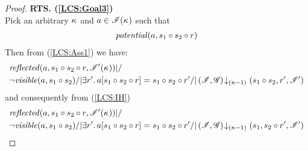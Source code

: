 \begin{lemma}
\begin{proof}
\noindent\textbf{RTS. (\ref{LCS:Goal3})}\\
Pick an arbitrary $\kappa_{}$ and $a \in \mathscr{I}(\kappa_{})$ such that 
\begin{align}
	\mathit{potential}(a, s_1 \circ s_2 \circ r) \label{LCS:Ass12}
\end{align}
Then from (\ref{LCS:Ass1}) we have: 
%
\begin{align*}
  &\m{reflected}(a,s_1 \composeL s_2 \composeL r,\lmod'(\ca{})) |/\null \nonumber \\
%  
  &\neg\m{visible}(a,s_1 \composeL s_2) /| \exsts{r'} a[s_1 \composeL s_2 \composeL r] = s_1 \composeL s_2 \composeL r' /| \extendsAMUpto{\lmod, \gmod}{(n-1)}{s_1 \composeL s_2}{r'}{\lmod'}  \nonumber
\end{align*}
%
and consequently from (\ref{LCS:IH})
%
\begin{align*}
  &\m{reflected}(a,s_1 \composeL s_2 \composeL r,\lmod'(\ca{})) |/\null \nonumber \\
%  
  &\neg\m{visible}(a,s_1 \composeL s_2) /| \exsts{r'} a[s_1 \composeL s_2 \composeL r] = s_1 \composeL s_2 \composeL r' /| \extendsAMUpto{\lmod, \gmod}{(n-1)}{s_1}{s_2 \composeL r'}{\lmod'}  \nonumber
\end{align*}
%

\end{proof}
\end{lemma}
